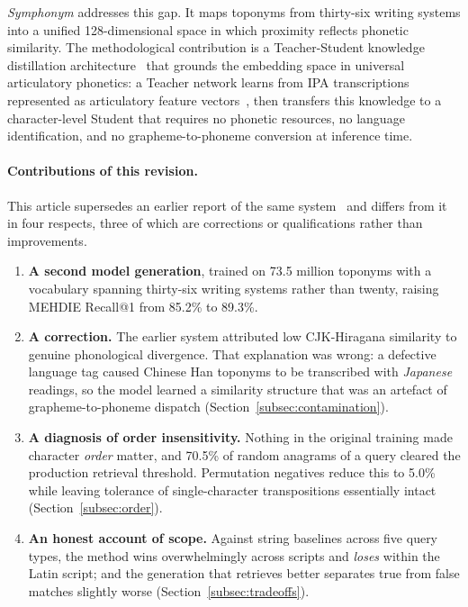 \documentclass[11pt,a4paper]{article}
\begin{document}
\emph{Symphonym} addresses this gap. It maps toponyms from thirty-six writing systems into a unified 128-dimensional space in which proximity reflects phonetic similarity. The methodological contribution is a Teacher-Student knowledge distillation architecture~\citep{hinton2015distilling} that grounds the embedding space in universal articulatory phonetics: a Teacher network learns from IPA transcriptions represented as articulatory feature vectors~\citep{mortensen2016}, then transfers this knowledge to a character-level Student that requires no phonetic resources, no language identification, and no grapheme-to-phoneme conversion at inference time.

\paragraph{Contributions of this revision.} This article supersedes an earlier report of the same system~\citep{symphonym2026} and differs from it in four respects, three of which are corrections or qualifications rather than improvements.

\begin{enumerate}
\item \textbf{A second model generation}, trained on 73.5 million toponyms with a vocabulary spanning thirty-six writing systems rather than twenty, raising MEHDIE Recall@1 from 85.2\% to 89.3\%.
\item \textbf{A correction.} The earlier system attributed low CJK-Hiragana similarity to genuine phonological divergence. That explanation was wrong: a defective language tag caused Chinese Han toponyms to be transcribed with \emph{Japanese} readings, so the model learned a similarity structure that was an artefact of grapheme-to-phoneme dispatch (Section~\ref{subsec:contamination}).
\item \textbf{A diagnosis of order insensitivity.} Nothing in the original training made character \emph{order} matter, and 70.5\% of random anagrams of a query cleared the production retrieval threshold. Permutation negatives reduce this to 5.0\% while leaving tolerance of single-character transpositions essentially intact (Section~\ref{subsec:order}).
\item \textbf{An honest account of scope.} Against string baselines across five query types, the method wins overwhelmingly across scripts and \emph{loses} within the Latin script; and the generation that retrieves better separates true from false matches slightly worse (Section~\ref{subsec:tradeoffs}).
\end{enumerate}
\end{document}
